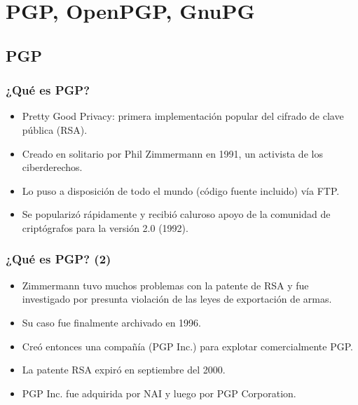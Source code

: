 \documentclass{beamer}
\begin{document}
\usebackgroundtemplate{}




\section{PGP, OpenPGP, GnuPG}

\subsection{PGP}

\begin{frame}
\frametitle{¿Qué es PGP?}

\begin{itemize}
\item \alert{Pretty Good Privacy}: primera implementación popular del cifrado de clave pública (RSA).
\item Creado en solitario por Phil Zimmermann en 1991, un activista de los ciberderechos. 
\item Lo puso a disposición de todo el mundo (código fuente incluido) vía FTP.
\item Se popularizó rápidamente y recibió caluroso apoyo de la comunidad de criptógrafos para la versión 2.0 (1992).
\end{itemize}

\end{frame}


\begin{frame}
\frametitle{¿Qué es PGP? (2)}

\begin{itemize}
\item Zimmermann tuvo muchos problemas con la patente de RSA y fue investigado por presunta violación de las leyes de exportación de armas.
\item Su caso fue finalmente archivado en 1996.
\item Creó entonces una compañía (PGP Inc.) para explotar comercialmente PGP.
\item La patente RSA expiró en septiembre del 2000.
\item PGP Inc. fue adquirida por NAI y luego por PGP Corporation.
\end{itemize}

\end{frame}
\end{document}
